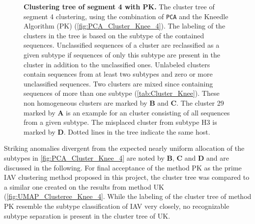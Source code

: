 \begin{figure}[!hbt]
    \caption[Clustering tree of segment 4 with PK]{\textbf{Clustering tree of segment 4 with PK.} The cluster tree of segment 4 clustering, using the combination of \texttt{PCA} and the Kneedle Algorithm (PK) (\autoref{fig:PCA_Cluster_Knee_4}). The labeling of the clusters in the tree is based on the subtype of the contained sequences. Unclassified sequences of a cluster are reclassified as a given subtype if sequences of only this subtype are present in the cluster in addition to the unclassified ones. Unlabeled clusters contain sequences from at least two subtypes and zero or more unclassified sequences. Two clusters are mixed since containing sequences of more than one subtype (\autoref{tab:Cluster_Knee}). These non homogeneous clusters are marked by \textbf{\textsf{B}} and \textbf{\textsf{C}}. The cluster 29 marked by \textbf{\textsf{A}} is an example for an cluster consisting of all sequences from a given subtype. The misplaced cluster from subtype H3 is marked by \textbf{\textsf{D}}. Dotted lines in the tree indicate the same host.}
    \label{fig:PCA_Clusteree_Knee_4}
\end{figure}

Striking anomalies divergent from the expected nearly uniform allocation of the subtypes in \autoref{fig:PCA_Cluster_Knee_4} are noted by \textbf{\textsf{B}}, \textbf{\textsf{C}} and \textbf{\textsf{D}} and are discussed in the following. For final acceptance of the method PK as the prime \gls{IAV} clustering method proposed in this project, the cluster tree was compared to a similar one created on the results from method UK (\autoref{fig:UMAP_Clusteree_Knee_4}. While the labeling of the cluster tree of method PK resemble the subtype classification of \gls{IAV} very closely, no recognizable subtype separation is present in the cluster tree of UK. 
